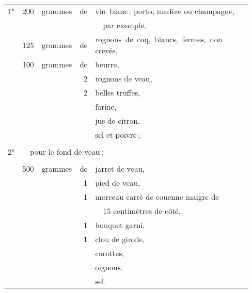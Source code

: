 \label{pg0426} \hypertarget{p0426}{}
\footnotesize
\begin{tabular}{@{}lrrrp{18em}}
\normalsize1°\footnotesize & 200 & grammes & de & vin blanc : porto, madère ou champagne,                 \\
   &     &         &    &    par exemple,                                                                 \\
   & 125 & grammes & de & rognons de coq, blancs, fermes, non crevés,                                     \\
   & 100 & grammes & de & beurre,                                                                         \\
   &     &         &  2 & rognons de veau,                                                                \\
   &     &         &  2 & belles truffes,                                                                 \\
   &     &         &    & farine,                                                                         \\
   &     &         &    & jus de citron,                                                                  \\
   &     &         &    & sel et poivre ;                                                                 \\
   &     &         &    &                                                                                 \\
\normalsize 2° & \multicolumn{4}{l}{\normalsize   pour le fond de veau :}                                 \\
\footnotesize
   &     &         &    &                                                                                 \\
   & 500 & grammes & de & jarret de veau,                                                                 \\
   &     &         &  1 & pied de veau,                                                                   \\
   &     &         &  1 & morceau carré de couenne maigre de                                              \\
   &     &         &    &   15 centimètres de côté,                                                       \\
   &     &         &  1 & bouquet garni,                                                                  \\
   &     &         &  1 & clou de girofle,                                                                \\
   &     &         &    & carottes,                                                                       \\
   &     &         &    & oignons.                                                                        \\
   &     &         &    & sel.                                                                            \\
\end{tabular}
\normalsize

